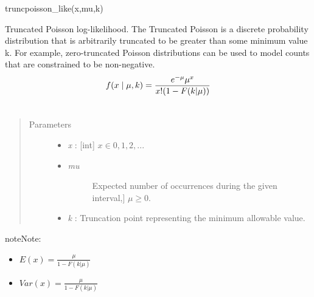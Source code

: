 \documentclass[letterpaper,10pt,english]{sphinxmanual}
\begin{document}
\begin{fulllineitems}
\label{distributions:pymc.distributions.truncated_poisson_like}
truncpoisson\_like(x,mu,k)

Truncated Poisson log-likelihood. The Truncated Poisson is a
discrete probability distribution that is arbitrarily truncated to
be greater than some minimum value k. For example, zero-truncated
Poisson distributions can be used to model counts that are
constrained to be non-negative.
\begin{gather}
\begin{split}f(x \mid \mu, k) = \frac{e^{-\mu}\mu^x}{x!(1-F(k|\mu))}\end{split}\notag\\\begin{split}\end{split}\notag
\end{gather}\begin{quote}\begin{description}
\item[{Parameters }] \leavevmode\begin{itemize}
\item {} 
\emph{x} : {[}int{]} $x \in {0,1,2,...}$

\item {} \begin{description}
\item[{\emph{mu}}] \leavevmode{[}Expected number of occurrences during the given interval,{]}
$\mu \geq 0$.

\end{description}

\item {} 
\emph{k} : Truncation point representing the minimum allowable value.

\end{itemize}

\end{description}\end{quote}

\begin{notice}{note}{Note:}\begin{itemize}
\item {} 
$E(x)=\frac{\mu}{1-F(k|\mu)}$

\item {} 
$Var(x)=\frac{\mu}{1-F(k|\mu)}$

\end{itemize}
\end{notice}

\end{fulllineitems}
\end{document}
